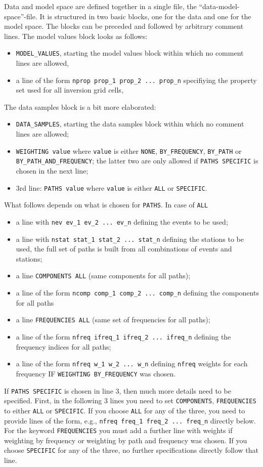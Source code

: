 Data and model space are defined together in a single file, the ``data-model-space''-file. It is structured in two basic blocks, one for the data and one for the model space. The blocks can be preceded and followed by arbitrary comment lines. The model values block looks as follows:
%
\begin{itemize}
	\setlength{\itemsep}{-0.1cm}
	\item \verb+MODEL_VALUES+, starting the model values block within which no comment lines are allowed,
	\item  a line of the form \verb+nprop prop_1 prop_2 ... prop_n+ specifiying the property set used for all inversion grid cells,
\end{itemize}
%
The data samples block is a bit more elaborated:
\begin{itemize}
	\setlength{\itemsep}{-0.1cm}
	\item \verb+DATA_SAMPLES+, starting the data samples block within which no comment lines are allowed;
	\item \verb+WEIGHTING value+ where \verb+value+ is either \verb+NONE+, \verb+BY_FREQUENCY+, \verb+BY_PATH+ or \verb+BY_PATH_AND_FREQUENCY+; the latter two are only allowed if \verb+PATHS SPECIFIC+ is chosen in the next line;
	\item 3rd line: \verb+PATHS value+ where \verb+value+ is either \verb+ALL+ or \verb+SPECIFIC+.
\end{itemize}
What follows depends on what is chosen for \verb+PATHS+. In case of \verb+ALL+
\begin{itemize}
	\setlength{\itemsep}{-0.1cm}
	\item a line with \verb+nev ev_1 ev_2 ... ev_n+ defining the events to be used;
	\item a line with \verb+nstat stat_1 stat_2 ... stat_n+ defining the stations to be used, the full set of paths is built from all combinations of events and stations;
	\item a line \verb+COMPONENTS ALL+ (same components for all paths);
	\item a line of the form \verb+ncomp comp_1 comp_2 ... comp_n+ defining the components for all paths
	\item a line \verb+FREQUENCIES ALL+ (same set of frequencies for all paths);
	\item a line of the form \verb+nfreq ifreq_1 ifreq_2 ... ifreq_n+ defining the frequency indices for all paths;
	\item a line of the form \verb+nfreq w_1 w_2 ... w_n+ defining \verb+nfreq+ weights for each frequency IF \verb+WEIGHTING BY_FREQUENCY+ was chosen.
\end{itemize}
 If \verb+PATHS SPECIFIC+ is chosen in line 3, then much more details need to be specified. First, in the following 3 lines you need to set \verb+COMPONENTS+, \verb+FREQUENCIES+ to either \verb+ALL+ or \verb+SPECIFIC+. If you choose \verb+ALL+ for any of the three, you need to provide lines of the form, e.g., \verb+nfreq freq_1 freq_2 ... freq_n+ directly below. For the keyword \verb+FREQUENCIES+ you must add a further line with weights if weighting by frequency or weighting by path and frequency was chosen. If you choose \verb+SPECIFIC+ for any of the three, no further specifications directly follow that line.

